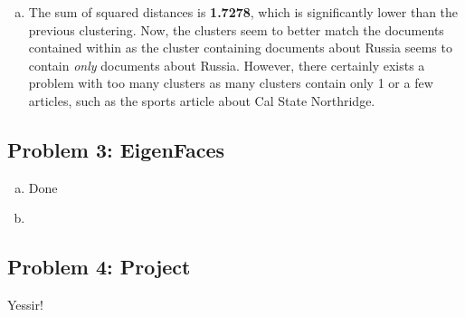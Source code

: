 \documentclass[twoside,11pt]{article}
\newcommand{\figdir}{figs}
\theoremstyle{definition}
\begin{document}
\begin{enumerate}[(a)]
\item The sum of squared distances is \textbf{1.7278}, which is significantly lower than the previous clustering.
Now, the clusters seem to better match the documents contained within as the cluster containing documents about Russia seems to contain \emph{only} documents about Russia.
However, there certainly exists a problem with too many clusters as many clusters contain only 1 or a few articles, such as the sports article about Cal State Northridge.

\end{enumerate}


\subsection*{Problem 3: EigenFaces}

\begin{enumerate}[(a)]
\item Done
\item 
\end{enumerate}


\subsection*{Problem 4: Project}

Yessir!
\end{document}
